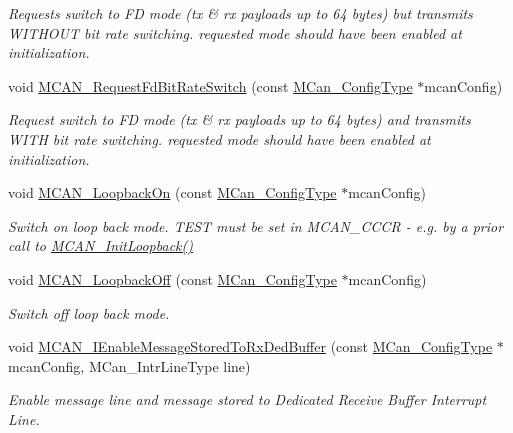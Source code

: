 \begin{DoxyCompactItemize}
\begin{DoxyCompactList}\small\item\em Requests switch to FD mode (tx \& rx payloads up to 64 bytes) but transmits W\+I\+T\+H\+O\+UT bit rate switching. requested mode should have been enabled at initialization. \end{DoxyCompactList}\item 
void \mbox{\hyperlink{group__can__module_gaa1d5fa926fb534c0dea67923865fb356}{M\+C\+A\+N\+\_\+\+Request\+Fd\+Bit\+Rate\+Switch}} (const \mbox{\hyperlink{structMCan__ConfigTag}{M\+Can\+\_\+\+Config\+Type}} $\ast$mcan\+Config)
\begin{DoxyCompactList}\small\item\em Request switch to FD mode (tx \& rx payloads up to 64 bytes) and transmits W\+I\+TH bit rate switching. requested mode should have been enabled at initialization. \end{DoxyCompactList}\item 
void \mbox{\hyperlink{group__can__module_gac00448534ba8dbcf25329259d2312c10}{M\+C\+A\+N\+\_\+\+Loopback\+On}} (const \mbox{\hyperlink{structMCan__ConfigTag}{M\+Can\+\_\+\+Config\+Type}} $\ast$mcan\+Config)
\begin{DoxyCompactList}\small\item\em Switch on loop back mode. T\+E\+ST must be set in M\+C\+A\+N\+\_\+\+C\+C\+CR -\/ e.\+g. by a prior call to \mbox{\hyperlink{group__can__module_ga97adc21dfdf714818018ae78b51bf02e}{M\+C\+A\+N\+\_\+\+Init\+Loopback()}} \end{DoxyCompactList}\item 
void \mbox{\hyperlink{group__can__module_ga7e36eef54b4e8a426a10c540de9457be}{M\+C\+A\+N\+\_\+\+Loopback\+Off}} (const \mbox{\hyperlink{structMCan__ConfigTag}{M\+Can\+\_\+\+Config\+Type}} $\ast$mcan\+Config)
\begin{DoxyCompactList}\small\item\em Switch off loop back mode. \end{DoxyCompactList}\item 
void \mbox{\hyperlink{group__can__module_ga51d74c9a24d0321d3a0846422f95c70a}{M\+C\+A\+N\+\_\+\+I\+Enable\+Message\+Stored\+To\+Rx\+Ded\+Buffer}} (const \mbox{\hyperlink{structMCan__ConfigTag}{M\+Can\+\_\+\+Config\+Type}} $\ast$mcan\+Config, M\+Can\+\_\+\+Intr\+Line\+Type line)
\begin{DoxyCompactList}\small\item\em Enable message line and message stored to Dedicated Receive Buffer Interrupt Line. \end{DoxyCompactList}\item 

\end{DoxyCompactItemize}
